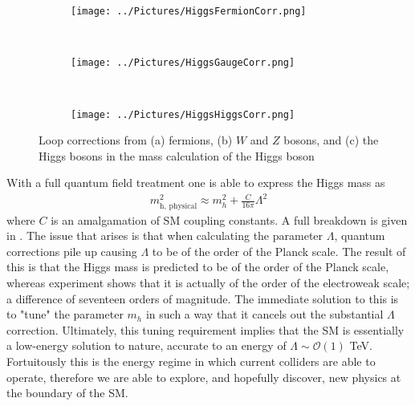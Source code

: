 \documentclass[12pt, oneside]{article}   	%
\begin{document}
\begin{figure}[H]
    \centering
    \begin{subfigure}[b]{0.33\textwidth}
        \centering
        \texttt{[image: ../Pictures/HiggsFermionCorr.png]}
        \caption{}
        \label{fig:FermionCorrection}
    \end{subfigure}
    ~
    \begin{subfigure}[b]{0.33\textwidth}
        \centering
        \texttt{[image: ../Pictures/HiggsGaugeCorr.png]}
	\caption{}
	\label{ref:BosonCorrection}
    \end{subfigure}
        ~
    \begin{subfigure}[b]{0.33\textwidth}
        \centering
        \texttt{[image: ../Pictures/HiggsHiggsCorr.png]}
        \caption{}
    \end{subfigure}
    \caption{Loop corrections from (a) fermions, (b) $W$ and $Z$ bosons, and (c) the Higgs bosons in the mass calculation of the Higgs boson}
    \label{fig:HiggsCorrections}
\end{figure}

\noindent With a full quantum field treatment one is able to express the Higgs mass as
\begin{align}
m_{\textrm{h, physical}}^{2} \approx m_{h}^{2} + \frac{C}{16 \pi} \Lambda^{2}
\end{align}
where $C$ is an amalgamation of SM coupling constants.
A full breakdown is given in \cite{baer2015supergravity}.
The issue that arises is that when calculating the parameter $\Lambda$, quantum corrections pile up causing $\Lambda$ to be of the order of the Planck scale.
The result of this is that the Higgs mass is predicted to be of the order of the Planck scale, whereas experiment shows that it is actually of the order of the electroweak scale; a difference of seventeen orders of magnitude.
The immediate solution to this is to "tune" the parameter $m_{h}$ in such a way that it cancels out the substantial $\Lambda$ correction.
Ultimately, this tuning requirement implies that the SM is essentially a low-energy solution to nature,  accurate to an energy of $\Lambda \sim \mathcal{O}(1)$ TeV.
Fortuitously this is the energy regime in which current colliders are able to operate, therefore we are able to explore, and hopefully discover, new physics at the boundary of the SM.

\fancyhead[r]{\leftmark}
\end{document}
